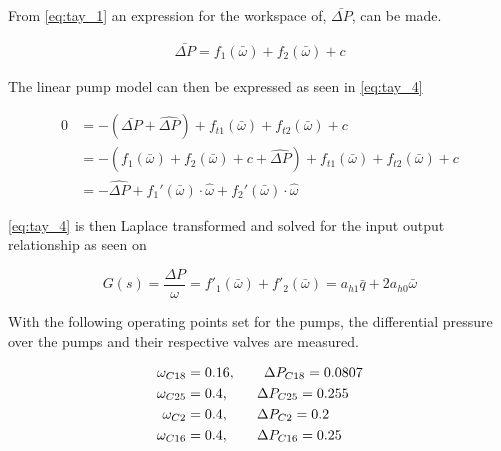 From \eqref{eq:tay_1} an expression for the workspace of, $\bar{\Delta P}$, can be made.

\begin{equation}
\begin{split}
\bar{\Delta P} = f_{1}(\bar{\omega}) + f_{2}(\bar{\omega}) + c
\end{split}
\label{eq:tay_3}
\end{equation}

The linear pump model can then be expressed as seen in \eqref{eq:tay_4}

\begin{equation}
\begin{split}
0 &= -(\bar{\Delta P} + \hat{\Delta P}) + f_{t1}(\bar{\omega}) + f_{t2}(\bar{\omega}) + c\\
  &= -(f_{1}(\bar{\omega}) + f_{2}(\bar{\omega}) + c + \hat{\Delta P}) + f_{t1}(\bar{\omega}) + f_{t2}(\bar{\omega}) + c \\ 
  &= -\hat{\Delta P} + f_1'(\bar{\omega})\cdot\hat{\omega} + f_2'(\bar{\omega})\cdot\hat{\omega}
\end{split}
\label{eq:tay_4}
\end{equation}

\eqref{eq:tay_4} is then Laplace transformed and solved for the input output relationship as seen on 

\begin{equation}
G(s) = \frac{\Delta P}{\omega} = f'_1(\bar{\omega}) + f'_2(\bar{\omega}) = a_{h1}\bar{q} + 2a_{h0}\bar{\omega}
\label{eq:lin_pump_simon}
\end{equation}

With the following operating points set for the pumps, the differential pressure over the pumps and their respective valves are measured. 

\begin{equation}
\centering
	\begin{split}
	\omega_{C18} &= 0.16,\hspace{20pt} \Delta P_{C18} = 0.0807 \\
	\omega_{C25} &= 0.4,\hspace{20pt} \Delta P_{C25} = 0.255  \\
	\omega_{C2}  &= 0.4,\hspace{20pt} \Delta P_{C2} = 0.2 \\
	\omega_{C16} &= 0.4,\hspace{20pt} \Delta P_{C16} =0.25 
	\end{split}
\end{equation}

